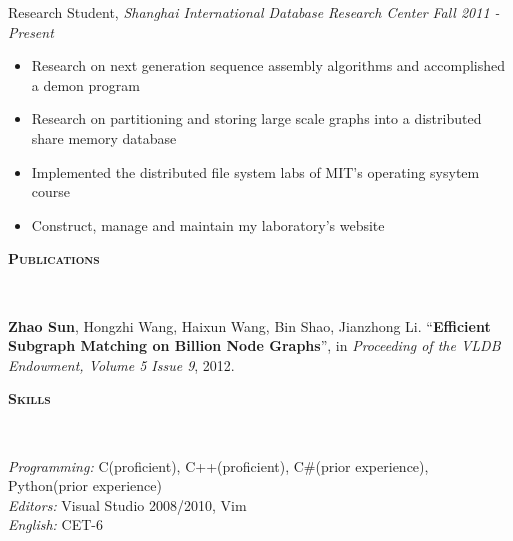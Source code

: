 \documentclass[9pt]{article}
\newenvironment{changemargin}[2]{%
  \begin{list}{}{%
    \setlength{\topsep}{0pt}%
    \setlength{\leftmargin}{#1}%
    \setlength{\rightmargin}{#2}%
    \setlength{\listparindent}{\parindent}%
    \setlength{\itemindent}{\parindent}%
    \setlength{\parsep}{\parskip}%
  }%
  \item[]}{\end{list}
}
\newcommand{\lineover}{
	\begin{changemargin}{-0.05in}{-0.05in}
		\vspace*{-8pt}
		\hrulefill \\
		\vspace*{-2pt}
	\end{changemargin}
}
\newcommand{\header}[1]{
	\begin{changemargin}{-0.5in}{-0.5in}
		\scshape{#1}\\
  	\lineover
	\end{changemargin}
}
\newenvironment{body} {
	\vspace*{-16pt}
	\begin{changemargin}{-0.25in}{-0.5in}
  }	
	{\end{changemargin}
}
\begin{document}
\begin{body}
    \vspace{14pt}
    Research Student, \emph{Shanghai International Database Research Center} \hfill \emph{Fall 2011 - Present}
    \vspace*{-4pt}
    \begin{itemize} \itemsep -0pt
        \item Research on next generation sequence assembly algorithms and accomplished a demon program
        \item Research on partitioning and storing large scale graphs into a distributed share memory database
        \item Implemented the distributed file system labs of MIT's operating sysytem course
        \item Construct, manage and maintain my laboratory's website
    \end{itemize}
\end{body}
\smallskip
\header{\textbf{Publications}}

\begin{body}
	\vspace{14pt}
	\textbf{Zhao Sun}, Hongzhi Wang, Haixun Wang, Bin Shao, Jianzhong Li. ``\textbf{Efficient Subgraph Matching on Billion Node Graphs}'', in \emph{Proceeding of the VLDB Endowment, Volume 5 Issue 9}, 2012.\\
\end{body}
\smallskip


\header{\textbf{Skills}}

\begin{body}
	\vspace{14pt}
	\emph{Programming:}{} C(proficient), C++(proficient), C\#(prior experience), Python(prior experience)\\
    \medskip
    \emph{Editors:}{} Visual Studio 2008/2010, Vim\\
    \medskip
    \emph{English:}{} CET-6
\end{body}
\smallskip


%
%
\end{document}
